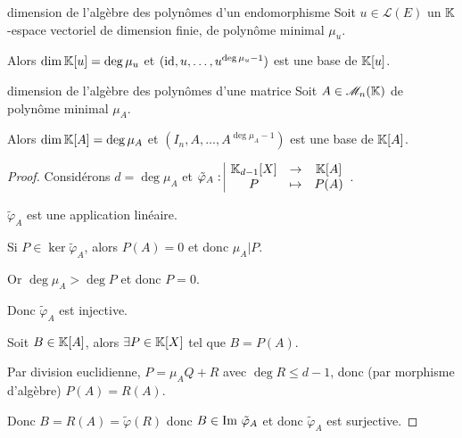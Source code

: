\begin{theorement}{dimension de l'algèbre des polynômes d'un endomorphisme}{}
    Soit $u \in \mathscr L(E)$ un $\mathbb{K}$-espace vectoriel de dimension finie, 
    de polynôme minimal $\mu_u$. 

    Alors $\dim \mathbb{K}[u] = \deg \mu_u$ et $(\operatorname{id}, u, \ldots, u^{\deg \mu_u - 1})$ est une base de $\mathbb{K}[u]$.
\end{theorement}

\begin{theorement}{dimension de l'algèbre des polynômes d'une matrice}{}
    Soit $A \in \mathscr M_n(\mathbb{K})$ de polynôme minimal $\mu_A$.

    Alors $\dim \mathbb{K}[A] = \deg \mu_A$ et $(I_n, A, \ldots, A^{\deg \mu_A - 1})$ est une base de $\mathbb{K}[A]$.
\end{theorement}

\begin{proof}
    Considérons $d = \deg \mu_A$ et $\tilde \varphi_A: \space \begin{array}{|ccc} \displaystyle \mathbb{K}_{d - 1}[X] & \to & \displaystyle \mathbb K[A] \\ \displaystyle P & \mapsto & \displaystyle P(A) \end{array}$.

    $\tilde \varphi_A$ est une application linéaire. 

    Si $P \in \ker \tilde \varphi_A$, alors $P(A) = 0$ et donc $\mu_A | P$.

    Or $\deg \mu_A > \deg P$ et donc $P = 0$.

    Donc $\tilde \varphi_A$ est injective.

    \avspace Soit $B \in \mathbb{K} [A]$, alors $\exists P \in \mathbb{K}[X]$ tel que $B = P(A)$.

    Par division euclidienne, $P = \mu_A Q + R$ avec $\deg R \leqslant d - 1$, donc 
    (par morphisme d'algèbre) $P(A) = R(A)$.

    Donc $B = R(A) = \tilde \varphi(R)$ donc $B \in \operatorname{Im} \, \tilde \varphi_A$ et donc 
    $\tilde \varphi_A$ est surjective.
\end{proof}


